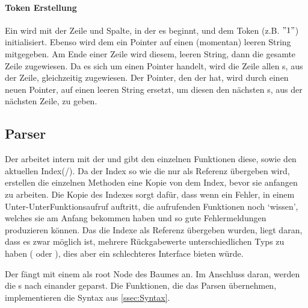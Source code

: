 {  \paragraph{Token Erstellung}
    Ein  wird mit der Zeile und Spalte, in der es beginnt, und dem Token (z.B. \myMIn$"1 "$) initialisiert. Ebenso wird dem  ein Pointer auf einen (momentan) leeren String mitgegeben. Am Ende einer Zeile wird diesem, leeren String, dann die gesamte Zeile zugewiesen. Da es sich um einen Pointer handelt, wird die Zeile allen s, aus der Zeile, gleichzeitig zugewiesen. Der Pointer, den der  hat, wird durch einen neuen Pointer, auf einen leeren String ersetzt, um diesen den nächsten s, aus der nächsten Zeile, zu geben.

  \subsection{Parser}
  \label{ssec:Parser}
    Der  arbeitet intern mit der  und gibt den einzelnen Funktionen diese, sowie den aktuellen Index(/). Da der Index so wie die  nur als Referenz übergeben wird, erstellen die einzelnen Methoden eine Kopie von dem Index, bevor sie anfangen zu arbeiten. Die Kopie des Indexes sorgt dafür, dass wenn ein Fehler, in einem Unter-UnterFunktionsaufruf auftritt, die aufrufenden Funktionen noch `wissen', welches  sie am Anfang bekommen haben und so gute Fehlermeldungen produzieren können. Das die Indexe als Referenz übergeben wurden, liegt daran, dass es zwar möglich ist, mehrere Rückgabewerte unterschiedlichen Typs zu haben ( oder ), dies aber ein schlechteres Interface bieten würde.

    Der  fängt mit einem  als root Node des Baumes an. Im Anschluss daran, werden die s nach einander geparst. Die Funktionen, die das Parsen übernehmen, implementieren die Syntax aus \autoref{ssec:Syntax}.

}
